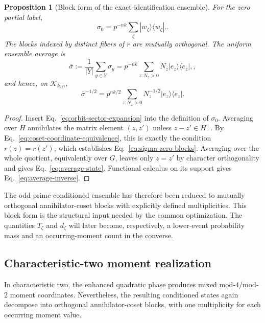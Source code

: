 \documentclass[11pt]{article}
\newcommand{\1}{\mathbf 1}
\theoremstyle{plain}
\newtheorem{proposition}[theorem]{Proposition}
\theoremstyle{definition}
\theoremstyle{remark}
\begin{document}
\begin{proposition}[Block form of the exact-identification ensemble]
\label{prop:conditioned-average-block-form}
For the zero partial label,
\begin{equation}
 \sigma_0=p^{-nk}\sum_{\zeta}|w_{\zeta}\rangle\!\langle w_{\zeta}|.          \label{eq:sigma-zero-blocks}.
\end{equation}
The blocks indexed by distinct fibers of $r$ are mutually orthogonal.  The
uniform ensemble average is
\begin{equation}
 \overline\sigma:=\frac1{\lvert Y\rvert}\sum_{y\in Y}\sigma_y
 =p^{-nk}\sum_{z:N_z>0}N_z|e_z\rangle\!\langle e_z|,      \label{eq:average-state},
\end{equation}
and hence, on $\mathcal K_{k,n}$,
\begin{equation}
 \overline\sigma^{-1/2}
 =p^{nk/2}\sum_{z:N_z>0}N_z^{-1/2}|e_z\rangle\!\langle e_z|.
                                                        \label{eq:average-inverse}
\end{equation}
\end{proposition}
\begin{proof}
Insert Eq.~\eqref{eq:orbit-sector-expansion} into the definition of $\sigma_0$.
Averaging over $H$ annihilates the matrix element $(z,z')$ unless
$z-z'\in H^\perp$.  By
Eq.~\eqref{eq:coset-coordinate-equivalence}, this is exactly the condition
$r(z)=r(z')$, which establishes Eq.~\eqref{eq:sigma-zero-blocks}.  Averaging over
the whole quotient, equivalently over $G$, leaves only $z=z'$ by character
orthogonality and gives Eq.~\eqref{eq:average-state}.  Functional calculus on
its support gives Eq.~\eqref{eq:average-inverse}.
\end{proof}

The odd-prime conditioned ensemble has therefore been reduced to mutually  
orthogonal annihilator-coset blocks with explicitly defined multiplicities.  
This block form is the structural input needed by the common optimization.  
The quantities $T_{\zeta}$ and $d_{\zeta}$ will later become, respectively, a  
lower-event probability mass and an occurring-moment count in the converse.  


\subsection{Characteristic-two moment realization}
\label{sec:integrated-qubit-moments}
In characteristic two, the enhanced quadratic phase produces mixed mod-$4$/mod-$2$ moment coordinates.  Nevertheless, the resulting conditioned states again decompose into orthogonal annihilator-coset blocks, with one multiplicity for each occurring moment value.
\end{document}
